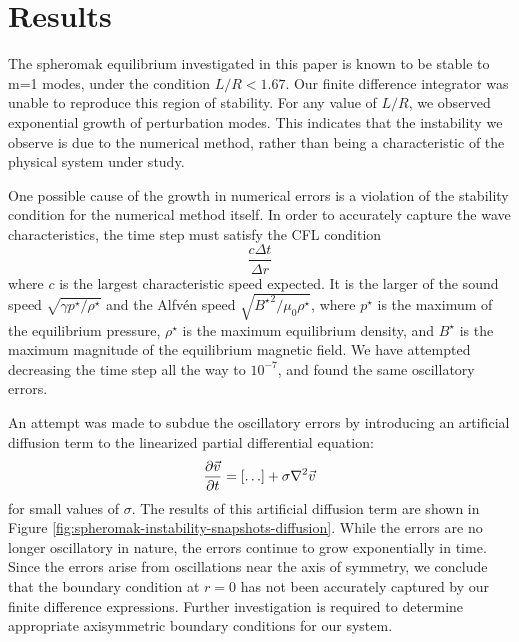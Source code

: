 \documentclass[%
 reprint,
 amsmath,amssymb,
 aps,
]{revtex4-2}
\begin{document}
\section{Results}

The spheromak equilibrium investigated in this paper is known to be stable to m=1 modes, under the condition $L/R < 1.67$. Our finite difference integrator was unable to reproduce this region of stability. For any value of $L/R$, we observed exponential growth of perturbation modes. This indicates that the instability we observe is due to the numerical method, rather than being a characteristic of the physical system under study.

One possible cause of the growth in numerical errors is a violation of the stability condition for the numerical method itself. In order to accurately capture the wave characteristics, the time step must satisfy the CFL condition
\begin{equation}
\frac{c \Delta t}{\Delta r}
\end{equation}
where $c$ is the largest characteristic speed expected. It is the larger of the sound speed $\sqrt{\gamma p^\star / \rho^\star}$ and the Alfvén speed $\sqrt{{B^\star}^2 / \mu_0 \rho ^\star}$, where $p^\star$ is the maximum of the equilibrium pressure, $\rho^\star$ is the maximum equilibrium density, and $B^\star$ is the maximum magnitude of the equilibrium magnetic field. We have attempted decreasing the time step all the way to $10^{-7}$, and found the same oscillatory errors.

An attempt was made to subdue the oscillatory errors by introducing an artificial diffusion term to the linearized partial differential equation:
\begin{equation}
\pdv{\vec v}{t} = [\ldots] + \sigma \nabla ^2 \vec v
\end{equation}
for small values of $\sigma$. The results of this artificial diffusion term are shown in Figure \ref{fig:spheromak-instability-snapshots-diffusion}. While the errors are no longer oscillatory in nature, the errors continue to grow exponentially in time. Since the errors arise from oscillations near the axis of symmetry, we conclude that the boundary condition at $r = 0$ has not been accurately captured by our finite difference expressions. Further investigation is required to determine appropriate axisymmetric boundary conditions for our system.


\pagebreak 
\end{document}
